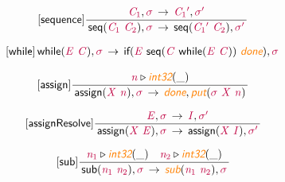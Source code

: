 \documentclass[11pt]{book}
\newcommand{\artVariable}[1]{\mbox{\color{purple}\em #1\/}}
\newcommand{\artConstructor}[1]{\mbox{\sf #1}}
\newcommand{\artSpecial}[1]{\mbox{\color{orange}\sf\em #1}}
\begin{document}
\begin{equation}
\tag*{[\artConstructor{\sf sequence}]}
\begin{split}\frac{\, \artVariable{C$_{1}$}, \artVariable{$\sigma$}\, \rightarrow \, \artVariable{C$_{1}$\/$^\prime$}, \artVariable{$\sigma$\/$^\prime$}\, }{\, \artConstructor{\sf seq}(\artVariable{C$_{1}$}\ \artVariable{C$_{2}$}), \artVariable{$\sigma$}\, \rightarrow \, \artConstructor{\sf seq}(\artVariable{C$_{1}$\/$^\prime$}\ \artVariable{C$_{2}$}), \artVariable{$\sigma$\/$^\prime$}\, }
\end{split}
\end{equation}

\begin{equation}
\tag*{[\artConstructor{\sf while}]}
\begin{split}\, \artConstructor{\sf while}(\artVariable{E}\ \artVariable{C}), \artVariable{$\sigma$}\, \rightarrow \, \artConstructor{\sf if}(\artVariable{E}\ \artConstructor{\sf seq}(\artVariable{C}\ \artConstructor{\sf while}(\artVariable{E}\ \artVariable{C}))\ \artSpecial{done}), \artVariable{$\sigma$}\, 
\end{split}
\end{equation}

\begin{equation}
\tag*{[\artConstructor{\sf assign}]}
\begin{split}\frac{ \artVariable{n}\triangleright \artSpecial{int32}(\_) }{\, \artConstructor{\sf assign}(\artVariable{X}\ \artVariable{n}), \artVariable{$\sigma$}\, \rightarrow \, \artSpecial{done}, \artSpecial{put}(\artVariable{$\sigma$}\ \artVariable{X}\ \artVariable{n})\, }
\end{split}
\end{equation}

\begin{equation}
\tag*{[\artConstructor{\sf assignResolve}]}
\begin{split}\frac{\, \artVariable{E}, \artVariable{$\sigma$}\, \rightarrow \, \artVariable{I}, \artVariable{$\sigma$\/$^\prime$}\, }{\, \artConstructor{\sf assign}(\artVariable{X}\ \artVariable{E}), \artVariable{$\sigma$}\, \rightarrow \, \artConstructor{\sf assign}(\artVariable{X}\ \artVariable{I}), \artVariable{$\sigma$\/$^\prime$}\, }
\end{split}
\end{equation}

\begin{equation}
\tag*{[\artConstructor{\sf sub}]}
\begin{split}\frac{ \artVariable{n$_{1}$}\triangleright \artSpecial{int32}(\_) \quad  \artVariable{n$_{2}$}\triangleright \artSpecial{int32}(\_) }{\, \artConstructor{\sf sub}(\artVariable{n$_{1}$}\ \artVariable{n$_{2}$}), \artVariable{$\sigma$}\, \rightarrow \, \artSpecial{sub}(\artVariable{n$_{1}$}\ \artVariable{n$_{2}$}), \artVariable{$\sigma$}\, }
\end{split}
\end{equation}
\end{document}
